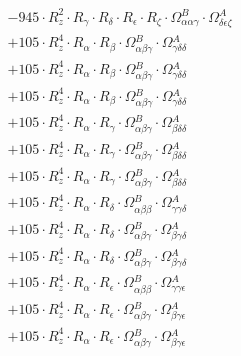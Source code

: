 \documentclass{article}
\begin{document}
\begin{subequations}
\begin{gather}
\begin{array}{c}
 \\[0.2em] 		 - 945 \cdot R_{z}^{2} \cdot R_{\gamma{}} \cdot R_{\delta{}} \cdot R_{\epsilon{}} \cdot R_{\zeta{}} \cdot \Omega{}^{B}_{\alpha{}\alpha{}\gamma{}} \cdot \Omega{}^{A}_{\delta{}\epsilon{}\zeta{}} 
 \\[0.2em] 		 + 105 \cdot R_{z}^{4} \cdot R_{\alpha{}} \cdot R_{\beta{}} \cdot \Omega{}^{B}_{\alpha{}\beta{}\gamma{}} \cdot \Omega{}^{A}_{\gamma{}\delta{}\delta{}} 
 \\[0.2em] 		 + 105 \cdot R_{z}^{4} \cdot R_{\alpha{}} \cdot R_{\beta{}} \cdot \Omega{}^{B}_{\alpha{}\beta{}\gamma{}} \cdot \Omega{}^{A}_{\gamma{}\delta{}\delta{}} 
 \\[0.2em] 		 + 105 \cdot R_{z}^{4} \cdot R_{\alpha{}} \cdot R_{\beta{}} \cdot \Omega{}^{B}_{\alpha{}\beta{}\gamma{}} \cdot \Omega{}^{A}_{\gamma{}\delta{}\delta{}} 
 \\[0.2em] 		 + 105 \cdot R_{z}^{4} \cdot R_{\alpha{}} \cdot R_{\gamma{}} \cdot \Omega{}^{B}_{\alpha{}\beta{}\gamma{}} \cdot \Omega{}^{A}_{\beta{}\delta{}\delta{}} 
 \\[0.2em] 		 + 105 \cdot R_{z}^{4} \cdot R_{\alpha{}} \cdot R_{\gamma{}} \cdot \Omega{}^{B}_{\alpha{}\beta{}\gamma{}} \cdot \Omega{}^{A}_{\beta{}\delta{}\delta{}} 
 \\[0.2em] 		 + 105 \cdot R_{z}^{4} \cdot R_{\alpha{}} \cdot R_{\gamma{}} \cdot \Omega{}^{B}_{\alpha{}\beta{}\gamma{}} \cdot \Omega{}^{A}_{\beta{}\delta{}\delta{}} 
 \\[0.2em] 		 + 105 \cdot R_{z}^{4} \cdot R_{\alpha{}} \cdot R_{\delta{}} \cdot \Omega{}^{B}_{\alpha{}\beta{}\beta{}} \cdot \Omega{}^{A}_{\gamma{}\gamma{}\delta{}} 
 \\[0.2em] 		 + 105 \cdot R_{z}^{4} \cdot R_{\alpha{}} \cdot R_{\delta{}} \cdot \Omega{}^{B}_{\alpha{}\beta{}\gamma{}} \cdot \Omega{}^{A}_{\beta{}\gamma{}\delta{}} 
 \\[0.2em] 		 + 105 \cdot R_{z}^{4} \cdot R_{\alpha{}} \cdot R_{\delta{}} \cdot \Omega{}^{B}_{\alpha{}\beta{}\gamma{}} \cdot \Omega{}^{A}_{\beta{}\gamma{}\delta{}} 
 \\[0.2em] 		 + 105 \cdot R_{z}^{4} \cdot R_{\alpha{}} \cdot R_{\epsilon{}} \cdot \Omega{}^{B}_{\alpha{}\beta{}\beta{}} \cdot \Omega{}^{A}_{\gamma{}\gamma{}\epsilon{}} 
 \\[0.2em] 		 + 105 \cdot R_{z}^{4} \cdot R_{\alpha{}} \cdot R_{\epsilon{}} \cdot \Omega{}^{B}_{\alpha{}\beta{}\gamma{}} \cdot \Omega{}^{A}_{\beta{}\gamma{}\epsilon{}} 
 \\[0.2em] 		 + 105 \cdot R_{z}^{4} \cdot R_{\alpha{}} \cdot R_{\epsilon{}} \cdot \Omega{}^{B}_{\alpha{}\beta{}\gamma{}} \cdot \Omega{}^{A}_{\beta{}\gamma{}\epsilon{}} 

\end{array}
\end{gather}
\end{subequations}
\end{document}
